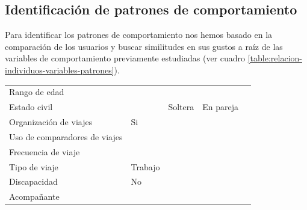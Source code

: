 \subsection{Identificación de patrones de comportamiento}
Para identificar los patrones de comportamiento nos hemos basado en la comparación de los usuarios y buscar similitudes en sus gustos a raíz de las variables de comportamiento previamente estudiadas (ver cuadro \ref{table:relacion-individuos-variables-patrones}).
\begin{table}[H]
    \centering
    \begin{tabular}{|p{10em}|p{7em}|p{7em}|p{7em}|p{8em}|}
        \cellcolor{black}                 & \cellcolor{black}{\textcolor{white}{Madi}}  & \cellcolor{black}{\textcolor{white}{Sofía}}   & \cellcolor{black}{\textcolor{white}{Beatriz}}     \\ \hline
        Rango de edad                     &                                             & \cellcolor{green}{18 - 25}                    & \cellcolor{green}{18 - 25}                        \\ \hline
        Estado civil                      &                                             & Soltera                                       & En pareja                                         \\ \hline
        Organización de viajes            & Si                                          & \cellcolor{green}{Si}                         & \cellcolor{green}{Si}                             \\ \hline
        Uso de comparadores de viajes     & \cellcolor{yellow}{No}                      & \cellcolor{purple}{Kayak, Skyscanner, Trivago}& \cellcolor{purple}{eDreams, comparador de Google} \\ \hline
        Frecuencia de viaje               & \cellcolor{yellow}{Alta}                    & \cellcolor{purple}{Media}                     & \cellcolor{purple}{Baja}                          \\ \hline
        Tipo de viaje                     & Trabajo                                     & \cellcolor{green}{Ocio}                       & \cellcolor{green}{Ocio}                           \\ \hline
        Discapacidad                      & No                                          & \cellcolor{green}{No}                         &                                                   \\ \hline
        Acompañante                       &                                             & \cellcolor{blue}{Familia}                     & \cellcolor{blue}{Familia}                         \\ \hline

\end{tabular}
\end{table}

